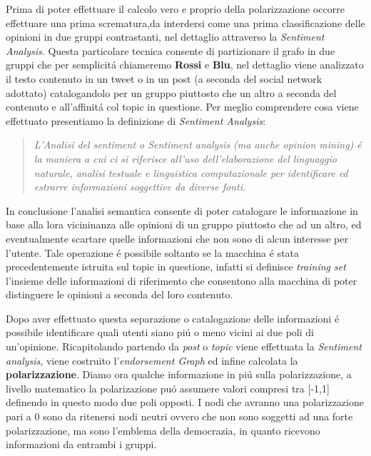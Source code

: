 Prima di poter effettuare il calcolo vero e proprio della polarizzazione occorre effettuare una prima scrematura,da interdersi come una prima classificazione delle opinioni in due gruppi contrastanti, nel dettaglio attraverso la \textit{Sentiment Analysis}. Questa particolare tecnica consente di partizionare il grafo in due gruppi che per semplicit\'a chiameremo \textbf{Rossi} e \textbf{Blu}, nel dettaglio viene analizzato il testo contenuto in un tweet o in un post (a seconda del social network adottato) catalogandolo per un gruppo piuttosto che un altro a seconda del contenuto e all'affinit\'a col topic in questione. 
Per meglio comprendere cosa viene effettuato presentiamo la definizione di \textit{Sentiment Analysis}:
\begin{quote}
\textit{L'Analisi del sentiment o Sentiment analysis (ma anche opinion mining) \'e la maniera a cui ci si riferisce all'uso dell'elaborazione del linguaggio naturale, analisi testuale e linguistica computazionale per identificare ed estrarre informazioni soggettive da diverse fonti.} 
\end{quote}

In conclusione l'analisi semantica consente di poter catalogare le informazione in base alla lora vicininanza alle opinioni di un gruppo piuttosto che ad un altro, ed eventualmente scartare quelle informazioni che non sono di alcun interesse per l'utente. Tale operazione \'e possibile soltanto se la macchina \'e stata precedentemente istruita sul topic in questione, infatti si definisce \textit{training set} l'insieme delle informazioni di riferimento che consentono alla macchina di poter distinguere le opinioni a seconda del loro contenuto.

Dopo aver effettuato questa separazione o catalogazione delle informazioni \'e possibile identificare quali utenti siano pi\'u o meno vicini ai due poli di un'opinione. Ricapitolando partendo da \textit{post} o \textit{topic} viene effettuata la \textit{Sentiment analysis}, viene costruito l'\textit{endorsement Graph} ed infine calcolata la \textbf{polarizzazione}.
Diamo ora qualche informazione in pi\'u sulla polarizzazione, a livello matematico la polarizazione pu\'o assumere valori compresi tra [-1,1] definendo in questo modo due poli opposti. I nodi che avranno una polarizzazione pari a 0 sono da ritenersi nodi neutri ovvero che non sono soggetti ad una forte polarizzazione, ma sono l'emblema della democrazia, in quanto ricevono informazioni da entrambi i gruppi.

